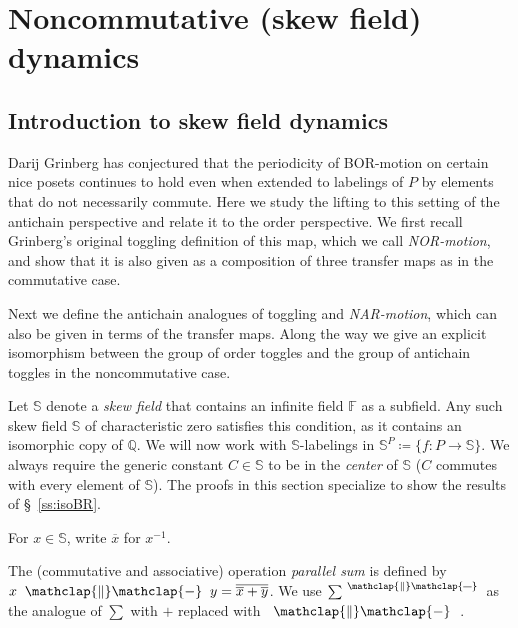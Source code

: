 \documentclass[ALCO,ThmDefs,Unicode,epreuves]{cedram}
\newcommand{\defn}[1]{\emph{#1}}
\newcommand{\bigsig}{{\sum}}
\DeclareMathOperator*{\sumpar}{\bigsig^{\ \mathclap{\|}\mathclap{\rule[1.3pt]{6pt}{0.4pt}}}\:}
\def\parallelsum{\:\ \mathclap{\|}\mathclap{-}\ \:}
\newcommand{\qq}{\mathbb{Q}}
\newcommand{\ff}{\mathbb{F}}
\newcommand{\bbs}{\mathbb{S}}
\begin{document}
\section{Noncommutative (skew field) dynamics}\label{sec:noncommutative}

\subsection{Introduction to skew field dynamics}

Darij Grinberg has conjectured that the periodicity of BOR-motion on certain nice posets
continues to hold even when extended to labelings of $P$ by elements that do not
necessarily commute. Here we study the lifting to this setting of the
antichain perspective and relate it to the order perspective. We first recall Grinberg's original toggling definition of this map, which we call \defn{NOR-motion}, and show that it is also given as a composition of three transfer maps as in the commutative case. 

Next we define the antichain analogues of toggling and \defn{NAR-motion}, which can also be given in terms of the transfer maps. Along the way we give an explicit isomorphism between the group of order toggles and the group of antichain toggles in the noncommutative case. 


Let $\bbs$ denote a \defn{skew field} that contains an infinite field $\ff$ as a
subfield. Any such skew field $\bbs$ of characteristic zero satisfies this condition, as it contains an isomorphic copy of $\qq$.
We will now work with $\bbs$-labelings in $\bbs^P\coloneqq \{f:P\rightarrow \bbs \}$.
We always require the generic constant $C\in \bbs$ to be in the
\emph{center} of $\bbs$ (\ie $C$ commutes with every element of $\bbs$). The proofs in
this section specialize to show the results of \S~\ref{ss:isoBR}. 

\begin{nota}
For $x\in\bbs$, write $\overline{x}$ for $x^{-1}$.
\end{nota}

\begin{nota}
The (commutative and associative) operation \defn{parallel sum} is defined by $x\parallelsum y=\overline{\overline{x}+\overline{y}}$.
We use $\sumpar$ as the analogue of $\sum$ with $+$ replaced with $\parallelsum$.
\end{nota}
\end{document}

